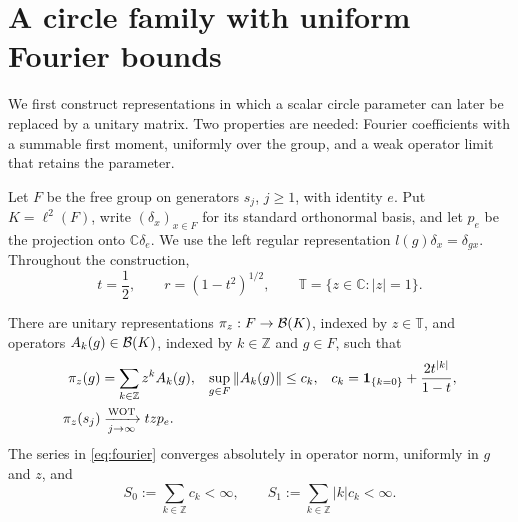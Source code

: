 \section{A circle family with uniform Fourier bounds}\label{sec:circle}

We first construct representations in which a scalar circle parameter can
later be replaced by a unitary matrix. Two properties are needed: Fourier
coefficients with a summable first moment, uniformly over the group, and
a weak operator limit that retains the parameter.

Let $F$ be the free group on generators $s_j$, $j\geq 1$, with identity
$e$. Put $K=\ell^2(F)$, write $(\delta_x)_{x\in F}$ for its standard
orthonormal basis, and let $p_e$ be the projection onto
$\mathbb C\delta_e$. We use the left regular representation
$l(g)\delta_x=\delta_{gx}$. Throughout the construction,
\[
 t=\frac12,\qquad r=(1-t^2)^{1/2},\qquad
 \mathbb T=\{z\in\mathbb C:|z|=1\}.
\]

\begin{proposition}\label{prop:circle}
There are unitary representations $\pi_z:F\to\mathcal B(K)$, indexed by
$z\in\mathbb T$, and operators $A_k(g)\in\mathcal B(K)$, indexed by
$k\in\mathbb Z$ and $g\in F$, such that
\begin{align}
 \pi_z(g)&=\sum_{k\in\mathbb Z}z^kA_k(g),
 &\sup_{g\in F}\|A_k(g)\|&\leq c_k,
 &c_k&=\mathbf 1_{\{k=0\}}+\frac{2t^{|k|}}{1-t},
 \label{eq:fourier}\\
 \pi_z(s_j)&\xrightarrow[j\to\infty]{\mathrm{WOT}}tzp_e.
 \label{eq:circle-limit}
\end{align}
The series in \eqref{eq:fourier} converges absolutely in operator norm,
uniformly in $g$ and $z$, and
\begin{equation}\label{eq:moments}
 S_0:=\sum_{k\in\mathbb Z}c_k<\infty,
 \qquad S_1:=\sum_{k\in\mathbb Z}|k|c_k<\infty.
\end{equation}
\end{proposition}

